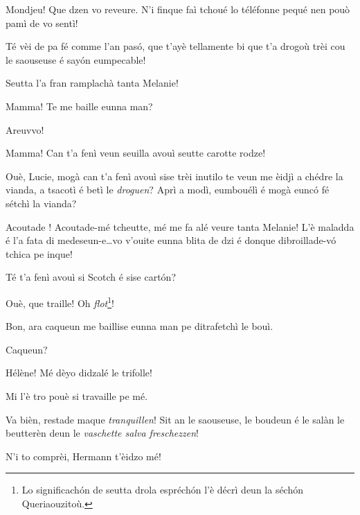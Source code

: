 \begin{drama}
\Luciespeaks Mondjeu! Que dzen vo reveure. N’i finque faì tchoué lo téléfonne pequé nen pouò pamì de vo sentì!


\Luciespeaks{} Té vèi de pa fé comme l'an pas\'o, que t'ayè tellamente bi que t'a drogoù trèi cou le saouseuse é say\'on eumpecable!

\Hermannspeaks{} Seutta l’a fran ramplachà tanta Melanie!

\Remyspeaks{} Mamma! Te me baille eunna man?

\Luciespeaks Areuvvo!

\Helenespeaks  Mamma! Can t'a fenì veun seuilla avouì seutte carotte rodze!

\Hermannspeaks{} Ouè, Lucie,  mogà can t’a fenì avouì sise trèi inutilo te veun me èidjì a chédre la vianda, a tsacotì é betì le \textit{droguen}? Aprì a modì, eumbouélì é mogà eunc\'o fé sétchì la vianda?

\Luciespeaks{} Acoutade \diavolofurioso ! Acoutade-mé tcheutte, mé me fa alé veure tanta Melanie! L'è maladda é l'a fata di medeseun-e\ldots vo v'ouite eunna blita de dzi é donque  dibroillade-v\'o tchica pe inque!


\scene[-- Se comenche!]

\Hermannspeaks{} Té t'a fenì avouì si Scotch é sise cart\'on?

\Cesarspeaks Ouè, que traille! Oh \textit{flot}\footnote{ Lo significach\'on de seutta drola espréch\'on l'è décrì deun la séch\'on Queriaouzitoù.}!

\Hermannspeaks Bon, ara caqueun me baillise eunna man pe ditrafetchì le bouì.


\Hermannspeaks{} Caqueun?

\Remyspeaks  Hélène! Mé dèyo didzalé le trifolle! 

\Helenespeaks  Mi l'è tro pouè si travaille pe mé.

\Hermannspeaks{} Va bièn, restade maque \textit{tranquillen}! Sit an le saouseuse, le boudeun é le salàn le beutterèn deun le \textit{vaschette salva freschezzen}!

\Cesarspeaks N’i to comprèi, Hermann t'èidzo mé!


\end{drama}
